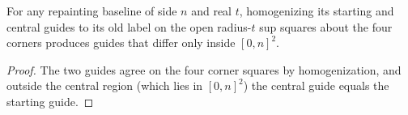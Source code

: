 \begin{lemma}
    \label{thm:peps_central_treated_support}
    \leanok
    For any repainting baseline of side $n$ and real $t$, homogenizing its starting and central guides to its old label on the open radius-$t$ sup squares about the four corners produces guides that differ only inside $[0,n]^2$.
\end{lemma}

\begin{proof}\leanok
    The two guides agree on the four corner squares by homogenization, and outside the central region (which lies in $[0,n]^2$) the central guide equals the starting guide.
\end{proof}

